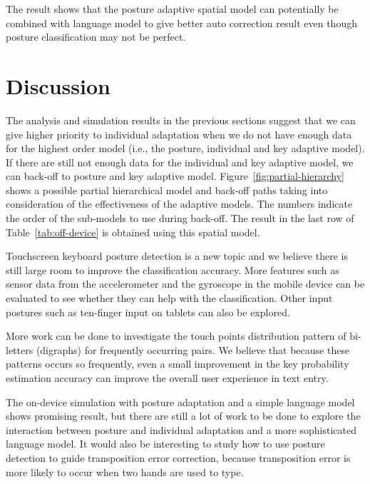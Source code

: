 \documentclass{sigchi}
\begin{document}
The result shows that the posture adaptive spatial model can potentially be combined 
with language model to give better auto correction result even though posture
classification may not be perfect. 

\section{Discussion}
The analysis and simulation results in the previous sections suggest that we
can give higher priority to individual adaptation when we do not have enough data for
the highest order model (i.e., the posture, individual and key adaptive model). 
If there are still not enough data for the individual and key adaptive model, we 
can back-off to posture and key adaptive model. Figure~\ref{fig:partial-hierarchy} 
shows a possible partial hierarchical model and back-off paths taking into consideration
of the effectiveness of the adaptive models. The numbers indicate the order of the 
sub-models to use during back-off. The result in the
last row of Table~\ref{tab:off-device} is obtained using this spatial model.

Touchscreen keyboard posture detection is a new topic and we believe there is still
large room to improve the classification accuracy. More features such as sensor data from 
the accelerometer and the gyroscope in the mobile device can be evaluated to see whether
they can help with the classification. Other input postures such as ten-finger input
on tablets can also be explored.

More work can be done to investigate the touch points distribution pattern of bi-letters (digraphs) 
for frequently occurring pairs. We believe that because these patterns occurs so frequently, even
a small improvement in the key probability estimation accuracy can improve the overall
user experience in text entry.  

The on-device simulation with posture adaptation and a simple language model shows promising result, but there are
still a lot of work to be done to explore the interaction between posture and individual adaptation and
a more sophisticated language model. It would also be interesting to study how
to use posture detection to guide transposition error correction, because transposition error
is more likely to occur when two hands are used to type.
\end{document}
